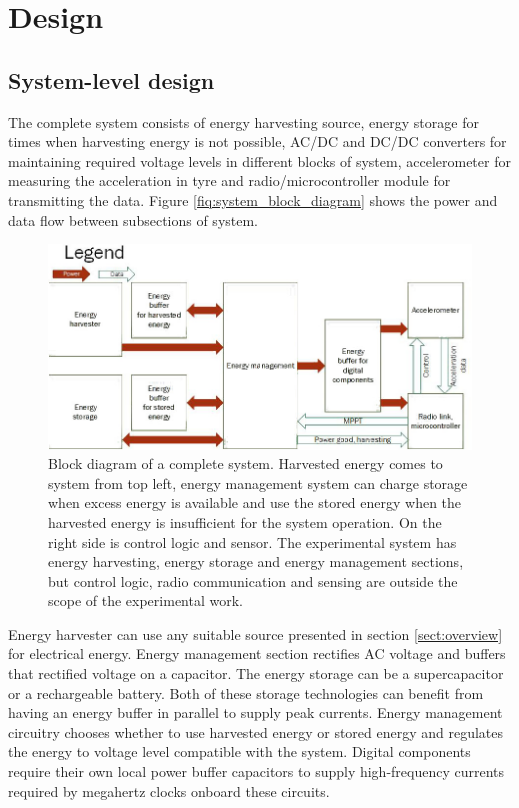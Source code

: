 \section{Design}\label{sect:design}
\subsection{System-level design}
The complete system consists of energy harvesting source, energy storage for times when harvesting energy is not possible, AC/DC and DC/DC converters for maintaining required voltage levels in different blocks of system, accelerometer for measuring the acceleration in tyre and radio/microcontroller module for transmitting the data. Figure \ref{fiq:system_block_diagram} shows the power and data flow between subsections of system. 


\begin{figure}[htb]
\begin{center}
\includegraphics[width=\columnwidth]{images/own_dwg/system_block_diagram.jpg}
\end{center}
\caption{\label{fiq:system_block_diagram} Block diagram of a complete system. Harvested energy comes to system from top left, energy management system can charge storage when excess energy is available and use the stored energy when the harvested energy is insufficient for the system operation. On the right side is control logic and sensor. The experimental system has energy harvesting, energy storage and energy management sections, but control logic, radio communication and sensing are outside the scope of the experimental work.}
\label{liitekuva}
\end{figure}

Energy harvester can use any suitable source presented in section \ref{sect:overview} for electrical energy. Energy management section rectifies AC voltage and buffers that rectified voltage on a capacitor. The energy storage can be a supercapacitor or a rechargeable battery. Both of these storage technologies can benefit from having an energy buffer in parallel to supply peak currents. Energy management circuitry chooses whether to use harvested energy or stored energy and regulates the energy to voltage level compatible with the system. Digital components require their own local power buffer capacitors to supply high-frequency currents required by megahertz clocks onboard these circuits.

